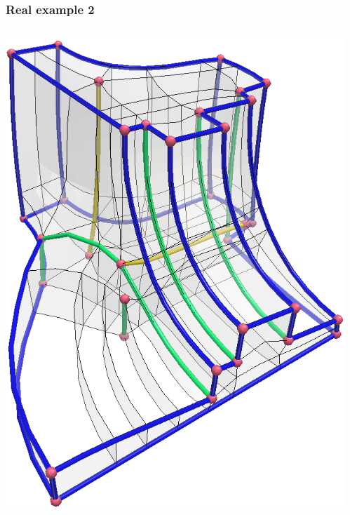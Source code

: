 \documentclass[12pt]{beamer}
\begin{document}
\begin{frame}[fragile]
  \frametitle{Real example 2}
  \begin{columns}
    \begin{column}{0.5\textwidth}
      \includegraphics[width=\textwidth]{./images/ex2-singularities.png}
    \end{column}
    \begin{column}{0.5\textwidth}

\end{column}
\end{columns}
\end{frame}
\end{document}
